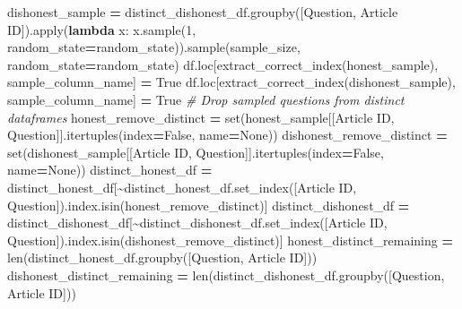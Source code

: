 \documentclass[
]{article}
\newenvironment{Shaded}{\begin{snugshade}}{\end{snugshade}}
\newcommand{\BuiltInTok}[1]{#1}
\newcommand{\CommentTok}[1]{\textcolor[rgb]{0.56,0.35,0.01}{\textit{#1}}}
\newcommand{\DecValTok}[1]{\textcolor[rgb]{0.00,0.00,0.81}{#1}}
\newcommand{\KeywordTok}[1]{\textcolor[rgb]{0.13,0.29,0.53}{\textbf{#1}}}
\newcommand{\NormalTok}[1]{#1}
\newcommand{\OperatorTok}[1]{\textcolor[rgb]{0.81,0.36,0.00}{\textbf{#1}}}
\newcommand{\StringTok}[1]{\textcolor[rgb]{0.31,0.60,0.02}{#1}}
\newcommand{\VariableTok}[1]{\textcolor[rgb]{0.00,0.00,0.00}{#1}}
\begin{document}
\begin{Shaded}
\begin{Highlighting}[]
\NormalTok{    dishonest\_sample }\OperatorTok{=}\NormalTok{ distinct\_dishonest\_df.groupby([}\StringTok{\textquotesingle{}Question\textquotesingle{}}\NormalTok{, }\StringTok{\textquotesingle{}Article ID\textquotesingle{}}\NormalTok{]).}\BuiltInTok{apply}\NormalTok{(}\KeywordTok{lambda}\NormalTok{ x: x.sample(}\DecValTok{1}\NormalTok{, random\_state}\OperatorTok{=}\NormalTok{random\_state)).sample(sample\_size, random\_state}\OperatorTok{=}\NormalTok{random\_state)}
\NormalTok{    df.loc[extract\_correct\_index(honest\_sample), sample\_column\_name] }\OperatorTok{=} \VariableTok{True}
\NormalTok{    df.loc[extract\_correct\_index(dishonest\_sample), sample\_column\_name] }\OperatorTok{=} \VariableTok{True}
    \CommentTok{\# Drop sampled questions from distinct dataframes}
\NormalTok{    honest\_remove\_distinct }\OperatorTok{=} \BuiltInTok{set}\NormalTok{(honest\_sample[[}\StringTok{\textquotesingle{}Article ID\textquotesingle{}}\NormalTok{, }\StringTok{\textquotesingle{}Question\textquotesingle{}}\NormalTok{]].itertuples(index}\OperatorTok{=}\VariableTok{False}\NormalTok{, name}\OperatorTok{=}\VariableTok{None}\NormalTok{))}
\NormalTok{    dishonest\_remove\_distinct }\OperatorTok{=} \BuiltInTok{set}\NormalTok{(dishonest\_sample[[}\StringTok{\textquotesingle{}Article ID\textquotesingle{}}\NormalTok{, }\StringTok{\textquotesingle{}Question\textquotesingle{}}\NormalTok{]].itertuples(index}\OperatorTok{=}\VariableTok{False}\NormalTok{, name}\OperatorTok{=}\VariableTok{None}\NormalTok{))}
\NormalTok{    distinct\_honest\_df }\OperatorTok{=}\NormalTok{ distinct\_honest\_df[}\OperatorTok{\textasciitilde{}}\NormalTok{distinct\_honest\_df.set\_index([}\StringTok{\textquotesingle{}Article ID\textquotesingle{}}\NormalTok{, }\StringTok{\textquotesingle{}Question\textquotesingle{}}\NormalTok{]).index.isin(honest\_remove\_distinct)]}
\NormalTok{    distinct\_dishonest\_df }\OperatorTok{=}\NormalTok{ distinct\_dishonest\_df[}\OperatorTok{\textasciitilde{}}\NormalTok{distinct\_dishonest\_df.set\_index([}\StringTok{\textquotesingle{}Article ID\textquotesingle{}}\NormalTok{, }\StringTok{\textquotesingle{}Question\textquotesingle{}}\NormalTok{]).index.isin(dishonest\_remove\_distinct)]}
\NormalTok{    honest\_distinct\_remaining }\OperatorTok{=} \BuiltInTok{len}\NormalTok{(distinct\_honest\_df.groupby([}\StringTok{\textquotesingle{}Question\textquotesingle{}}\NormalTok{, }\StringTok{\textquotesingle{}Article ID\textquotesingle{}}\NormalTok{]))}
\NormalTok{    dishonest\_distinct\_remaining }\OperatorTok{=} \BuiltInTok{len}\NormalTok{(distinct\_dishonest\_df.groupby([}\StringTok{\textquotesingle{}Question\textquotesingle{}}\NormalTok{, }\StringTok{\textquotesingle{}Article ID\textquotesingle{}}\NormalTok{]))}

\end{Highlighting}
\end{Shaded}
\end{document}
